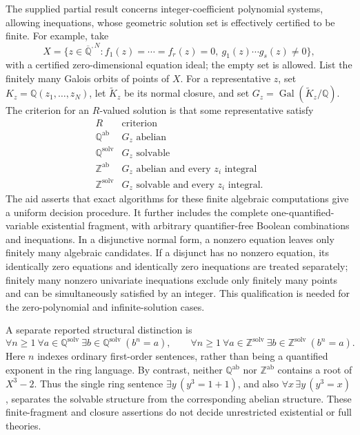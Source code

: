 \documentclass[11pt]{article}
\newcommand{\Z}{\mathbb{Z}}
\newcommand{\Q}{\mathbb{Q}}
\begin{document}
The supplied partial result concerns integer-coefficient polynomial systems, allowing inequations, whose geometric solution set is effectively certified to be finite. For example, take
\[
 X=\{z\in\overline{\Q}^{,N}:f_1(z)=\cdots=f_r(z)=0,
 \ g_1(z)\cdots g_s(z)\ne0\},
\]
with a certified zero-dimensional equation ideal; the empty set is allowed. List the finitely many Galois orbits of points of \(X\). For a representative \(z\), set \(K_z=\Q(z_1,\ldots,z_N)\), let \(\widetilde K_z\) be its normal closure, and set \(G_z=\operatorname{Gal}(\widetilde K_z/\Q)\). The criterion for an \(R\)-valued solution is that some representative satisfy
\[
\begin{array}{c|c}
R&\text{criterion}\\ \hline
\Q^{\mathrm{ab}}&G_z\text{ abelian}\\
\Q^{\mathrm{solv}}&G_z\text{ solvable}\\
\Z^{\mathrm{ab}}&G_z\text{ abelian and every }z_i\text{ integral}\\
\Z^{\mathrm{solv}}&G_z\text{ solvable and every }z_i\text{ integral}.
\end{array}
\]
The aid asserts that exact algorithms for these finite algebraic computations give a uniform decision procedure. It further includes the complete one-quantified-variable existential fragment, with arbitrary quantifier-free Boolean combinations and inequations. In a disjunctive normal form, a nonzero equation leaves only finitely many algebraic candidates. If a disjunct has no nonzero equation, its identically zero equations and identically zero inequations are treated separately; finitely many nonzero univariate inequations exclude only finitely many points and can be simultaneously satisfied by an integer. This qualification is needed for the zero-polynomial and infinite-solution cases.

A separate reported structural distinction is
\[
 \forall n\ge1\ \forall a\in\Q^{\mathrm{solv}}\ \exists b\in\Q^{\mathrm{solv}}\ (b^n=a),
 \qquad
 \forall n\ge1\ \forall a\in\Z^{\mathrm{solv}}\ \exists b\in\Z^{\mathrm{solv}}\ (b^n=a).
\]
Here \(n\) indexes ordinary first-order sentences, rather than being a quantified exponent in the ring language. By contrast, neither \(\Q^{\mathrm{ab}}\) nor \(\Z^{\mathrm{ab}}\) contains a root of \(X^3-2\). Thus the single ring sentence \(\exists y\,(y^3=1+1)\), and also \(\forall x\,\exists y\,(y^3=x)\), separates the solvable structure from the corresponding abelian structure. These finite-fragment and closure assertions do not decide unrestricted existential or full theories.
\end{document}
